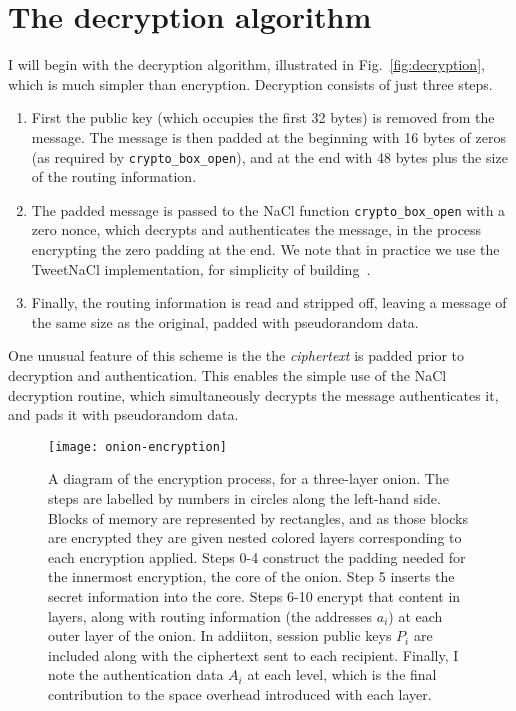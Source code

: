 \documentclass[letterpaper,twocolumn,amsmath,amssymb,pre,aps,10pt]{revtex4-1}
\begin{document}
\section{The decryption algorithm}

I will begin with the decryption algorithm, illustrated in
Fig.~\ref{fig:decryption}, which is much simpler than encryption.
Decryption consists of just three steps.
\begin{enumerate}
\item First the public key (which
  occupies the first 32 bytes) is removed from the message.  The message
  is then padded at the beginning with 16 bytes of zeros (as required by
  \verb!crypto_box_open!), and at the end with 48 bytes plus the size of
  the routing information.
\item The padded message is passed to the NaCl function
  \verb!crypto_box_open! with a zero nonce, which decrypts and
  authenticates the message, in the process encrypting the zero
  padding at the end.  We note that in practice we use the TweetNaCl
  implementation, for simplicity of
  building~\cite{bernstein2014tweetnacl}.
\item Finally, the routing information is read and stripped off,
  leaving a message of the same size as the original, padded with
  pseudorandom data.
\end{enumerate}
One unusual feature of this scheme is the the \emph{ciphertext} is
padded prior to decryption and authentication.  This enables the
simple use of the NaCl decryption routine, which simultaneously
decrypts the message authenticates it, and pads it with pseudorandom
data.

\begin{figure*}
  \begin{center}
    \vspace{-3em}
    \texttt{[image: onion-encryption]}
    \vspace{-10em}
  \end{center}
  \caption{A diagram of the encryption process, for a three-layer
    onion.  The steps are labelled by numbers in circles along the
    left-hand side. Blocks of memory are represented by rectangles,
    and as those blocks are encrypted they are given nested colored
    layers corresponding to each encryption applied.  Steps 0-4
    construct the padding needed for the innermost encryption, the
    core of the onion.  Step 5 inserts the secret information into the
    core.  Steps 6-10 encrypt that content in layers, along with
    routing information (the addresses $a_i$) at each outer layer of
    the onion.  In addiiton, session public keys $P_i$ are included
    along with the ciphertext sent to each recipient.  Finally, I
    note the authentication data $A_i$ at each level, which is the
    final contribution to the space overhead introduced with each
    layer.}\label{fig:algorithm}
\end{figure*}
\end{document}

